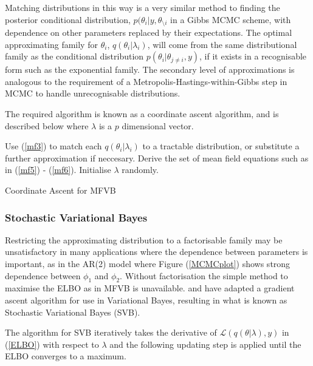 \documentclass[12pt,a4paper]{article}%
\numberwithin{equation}{section}
\begin{document}
Matching distributions in this way is a very similar method to finding the posterior conditional distribution, $p(\theta_i | y, \theta_{\setminus i}$ in a Gibbs MCMC scheme, with dependence on other parameters replaced by their expectations. The optimal approximating family for $\theta_i$, $q(\theta_i | \lambda_i)$, will come from the same distributional family as the conditional distribution $p(\theta_i | \theta_{j \neq i}, y)$, if it exists in a recognisable form such as the exponential family. The secondary level of approximations is analogous to the requirement of a Metropolis-Hastings-within-Gibbs step in MCMC to handle unrecognisable distributions.
\vspace{5mm}

The required algorithm is known as a coordinate ascent algorithm, and is described below where $\lambda$ is a $p$ dimensional vector.

\vspace{2mm}

\begin{algorithm}[H]
 Use (\ref{mf3}) to match each $q(\theta_i|\lambda_i)$ to a tractable distribution, or substitute a further approximation if neccesary.\;
 Derive the set of mean field equations such as in (\ref{mf5}) - (\ref{mf6}).\;
 Initialise $\lambda$ randomly. \;
 \caption{Coordinate Ascent for MFVB}
  \label{alg:algorithm1}
\end{algorithm}

\subsubsection{Stochastic Variational Bayes}

Restricting the approximating distribution to a factorisable family may be unsatisfactory in many applications where the dependence between parameters is important, as in the AR(2) model where Figure (\ref{MCMCplot}) shows strong dependence between $\phi_1$ and $\phi_2$. Without factorisation the simple method to maximise the ELBO as in MFVB is unavailable. \citet{Paisley2012} and \citet{Ranganath2014} have adapted a gradient ascent algorithm for use in Variational Bayes, resulting in what is known as Stochastic Variational Bayes (SVB).

The algorithm for SVB iteratively takes the  derivative of $\mathcal{L}(q(\theta | \lambda), y)$ in (\ref{ELBO}) with respect to $\lambda$ and the following updating step is applied until the ELBO converges to a maximum.
\end{document}
